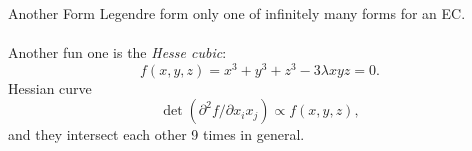 \documentclass{beamer}
\begin{document}
\begin{frame}
\end{frame}

\begin{frame}
\end{frame}

\begin{frame}
\end{frame}

\begin{frame}
\end{frame}

\begin{frame}
\end{frame}

\begin{frame}
\end{frame}

\begin{frame}[t]{Another Form}
	Legendre form only one of infinitely many forms for an EC. \\~\\

	Another fun one is the \emph{Hesse cubic}: 
	$$
		f(x,y,z) = x^{3} + y^{3} + z^{3} - 3\lambda xyz = 0.
	$$
	Hessian curve 
	$$
		\det ( \partial^{2} f / \partial x_{i}x_{j} ) \propto f(x,y,z),
	$$
	and they intersect each other 9 times in general. 
\end{frame}
\end{document}

